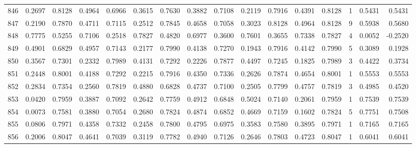 \begin{tabular}{lrrrrrrrrrrrrrrr}
846 &      0.2697 &  0.8128 &  0.4964 &  0.6966 &  0.3615 &  0.7630 &  0.3882 &  0.7108 &  0.2119 &  0.7916 &   0.4391 &     0.8128 &      1 &                    0.5431 &                     0.5431 \\
847 &      0.2190 &  0.7870 &  0.4711 &  0.7115 &  0.2512 &  0.7845 &  0.4658 &  0.7058 &  0.3023 &  0.8128 &   0.4964 &     0.8128 &      9 &                    0.5938 &                     0.5680 \\
848 &      0.7775 &  0.5255 &  0.7106 &  0.2518 &  0.7827 &  0.4820 &  0.6977 &  0.3600 &  0.7601 &  0.3655 &   0.7338 &     0.7827 &      4 &                    0.0052 &                    -0.2520 \\
849 &      0.4901 &  0.6829 &  0.4957 &  0.7143 &  0.2177 &  0.7990 &  0.4138 &  0.7270 &  0.1943 &  0.7916 &   0.4142 &     0.7990 &      5 &                    0.3089 &                     0.1928 \\
850 &      0.3567 &  0.7301 &  0.2332 &  0.7989 &  0.4131 &  0.7292 &  0.2226 &  0.7877 &  0.4497 &  0.7245 &   0.1825 &     0.7989 &      3 &                    0.4422 &                     0.3734 \\
851 &      0.2448 &  0.8001 &  0.4188 &  0.7292 &  0.2215 &  0.7916 &  0.4350 &  0.7336 &  0.2626 &  0.7874 &   0.4654 &     0.8001 &      1 &                    0.5553 &                     0.5553 \\
852 &      0.2834 &  0.7354 &  0.2560 &  0.7819 &  0.4880 &  0.6828 &  0.4737 &  0.7100 &  0.2505 &  0.7799 &   0.4757 &     0.7819 &      3 &                    0.4985 &                     0.4520 \\
853 &      0.0420 &  0.7959 &  0.3887 &  0.7092 &  0.2642 &  0.7759 &  0.4912 &  0.6848 &  0.5024 &  0.7140 &   0.2061 &     0.7959 &      1 &                    0.7539 &                     0.7539 \\
854 &      0.0073 &  0.7581 &  0.3880 &  0.7054 &  0.2680 &  0.7824 &  0.4874 &  0.6852 &  0.4669 &  0.7159 &   0.1602 &     0.7824 &      5 &                    0.7751 &                     0.7508 \\
855 &      0.0806 &  0.7971 &  0.4358 &  0.7332 &  0.2458 &  0.7800 &  0.4795 &  0.6975 &  0.3583 &  0.7580 &   0.3895 &     0.7971 &      1 &                    0.7165 &                     0.7165 \\
856 &      0.2006 &  0.8047 &  0.4641 &  0.7039 &  0.3119 &  0.7782 &  0.4940 &  0.7126 &  0.2646 &  0.7803 &   0.4723 &     0.8047 &      1 &                    0.6041 &                     0.6041 \\

\end{tabular}
